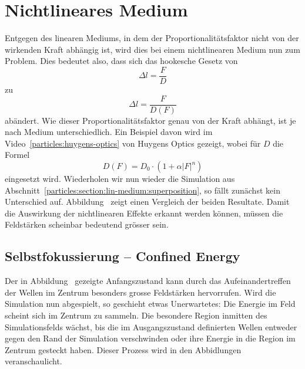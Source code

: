 %
%
%
%
\section{Nichtlineares Medium
\label{particles:section:nichtlinear}}
Entgegen des linearen Mediums, in dem der Proportionalitätsfaktor nicht von der wirkenden Kraft abhängig ist, 
wird dies bei einem nichtlinearen Medium nun zum Problem.
Dies bedeutet also, dass sich das hookesche Gesetz von 
\[
    \Delta l
    = 
    \frac{F}{D}
\]
zu
\[
    \Delta l
    = 
    \frac{F}{D(F)}
\]
abändert. 
Wie dieser Proportionalitätsfaktor genau von der Kraft abhängt, ist je nach Medium unterschiedlich.
Ein Beispiel davon wird im Video~\ref{particles:huygens-optics} von Huygens Optics gezeigt, wobei für $D$ die Formel 
\[
    D(F)
    =
    D_0
    \cdot
    (1 + \alpha |F|^n)
\]
eingesetzt wird.
Wiederholen wir nun wieder die Simulation aus Abschnitt~\ref{particles:section:lin-medium:superposition}, so fällt zunächst kein Unterschied auf.
Abbildung~ zeigt einen Vergleich der beiden Resultate.
Damit die Auswirkung der nichtlinearen Effekte erkannt werden können, müssen die Feldstärken scheinbar bedeutend grösser sein.

\subsection{Selbstfokussierung -- Confined Energy}
Der in Abbildung~ gezeigte Anfangszustand kann durch das Aufeinandertreffen der Wellen im Zentrum besonders grosse Feldstärken hervorrufen.
Wird die Simulation nun abgespielt, so geschieht etwas Unerwartetes: Die Energie im Feld scheint sich im Zentrum zu sammeln.
Die besondere Region inmitten des Simulationsfelds wächst, bis die im Ausgangszustand definierten Wellen entweder gegen den Rand der Simulation verschwinden oder ihre Energie in die Region im Zentrum gesteckt haben.
Dieser Prozess wird in den Abbidlungen~ veranschaulicht.

